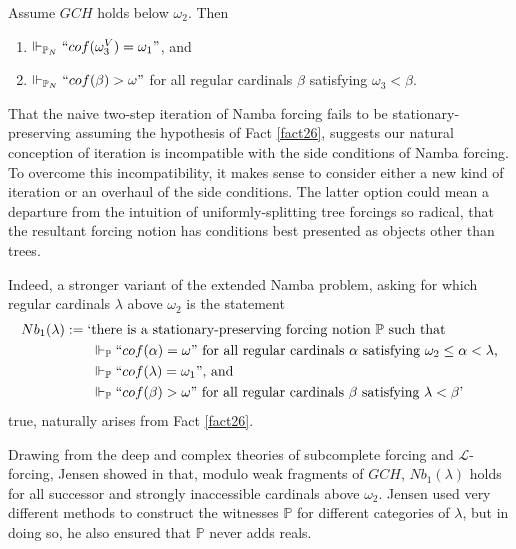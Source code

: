 \documentclass[12pt]{article}
\numberwithin{equation}{section}
\begin{document}
\begin{fact}\label{fact26}
Assume $GCH$ holds below $\omega_2$. Then 
\begin{enumerate}[label=(\arabic*)]
    \item $\Vdash_{\mathbb{P}_{N}} ``cof(\omega_3^V) = \omega_1"$, and
    \item $\Vdash_{\mathbb{P}_{N}} ``cof(\beta) > \omega"$ for all regular cardinals $\beta$ satisfying $\omega_3 < \beta$.
\end{enumerate}
\end{fact}

\begin{rem}\label{rem47}
That the naive two-step iteration of Namba forcing fails to be stationary-preserving assuming the hypothesis of Fact \ref{fact26}, suggests our natural conception of iteration is incompatible with the side conditions of Namba forcing. To overcome this incompatibility, it makes sense to consider either a new kind of iteration or an overhaul of the side conditions. The latter option could mean a departure from the intuition of uniformly-splitting tree forcings so radical, that the resultant forcing notion has conditions best presented as objects other than trees.
\end{rem}

Indeed, a stronger variant of the extended Namba problem, asking for which regular cardinals $\lambda$ above $\omega_2$ is the statement
\begin{align*}
    Nb_1(\lambda) := \text{`} & \text{there is a stationary-preserving forcing notion } \mathbb{P} \text{ such that} \\ 
    & \Vdash_{\mathbb{P}} ``cof(\alpha) = \omega" \text{ for all regular cardinals } \alpha \text{ satisfying } \omega_2 \leq \alpha < \lambda \text{,} \\
    & \Vdash_{\mathbb{P}} ``cof(\lambda) = \omega_1" \text{, and} \\
    & \Vdash_{\mathbb{P}} ``cof(\beta) > \omega" \text{ for all regular cardinals } \beta \text{ satisfying } \lambda < \beta \text{'}
\end{align*}
true, naturally arises from Fact \ref{fact26}.

Drawing from the deep and complex theories of subcomplete forcing and $\mathcal{L}$-forcing, Jensen showed in \cite{lforcing} that, modulo weak fragments of $GCH$, $Nb_1(\lambda)$ holds for all successor and strongly inaccessible cardinals above $\omega_2$. Jensen used very different methods to construct the witnesses $\mathbb{P}$ for different categories of $\lambda$, but in doing so, he also ensured that $\mathbb{P}$ never adds reals. 
\end{document}
